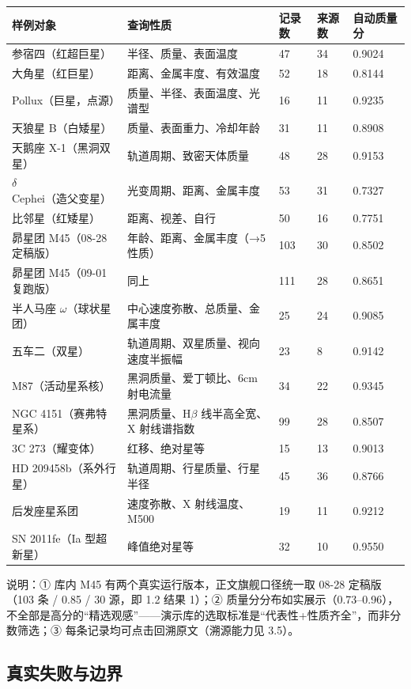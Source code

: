 \begin{longtable}{@{}p{3.2cm}p{4.8cm}p{1.7cm}p{1.7cm}p{2.0cm}@{}}
\toprule
样例对象 & 查询性质 & 记录数 & 来源数 & 自动质量分 \\
\midrule
参宿四（红超巨星） & 半径、质量、表面温度 & 47 & 34 & 0.9024 \\
大角星（红巨星） & 距离、金属丰度、有效温度 & 52 & 18 & 0.8144 \\
Pollux（巨星，点源） & 质量、半径、表面温度、光谱型 & 16 & 11 & 0.9235 \\
天狼星 B（白矮星） & 质量、表面重力、冷却年龄 & 31 & 11 & 0.8908 \\
天鹅座 X-1（黑洞双星） & 轨道周期、致密天体质量 & 48 & 28 & 0.9153 \\
$\delta$ Cephei（造父变星） & 光变周期、距离、金属丰度 & 53 & 31 & 0.7327 \\
比邻星（红矮星） & 距离、视差、自行 & 50 & 16 & 0.7751 \\
昴星团 M45（08-28 定稿版） & 年龄、距离、金属丰度（→5 性质） & 103 & 30 & 0.8502 \\
昴星团 M45（09-01 复跑版） & 同上 & 111 & 28 & 0.8651 \\
半人马座 $\omega$（球状星团） & 中心速度弥散、总质量、金属丰度 & 25 & 24 & 0.9085 \\
五车二（双星） & 轨道周期、双星质量、视向速度半振幅 & 23 & 8 & 0.9142 \\
M87（活动星系核） & 黑洞质量、爱丁顿比、6cm 射电流量 & 34 & 22 & 0.9345 \\
NGC 4151（赛弗特星系） & 黑洞质量、H$\beta$ 线半高全宽、X 射线谱指数 & 99 & 28 & 0.8507 \\
3C 273（耀变体） & 红移、绝对星等 & 15 & 13 & 0.9013 \\
HD 209458b（系外行星） & 轨道周期、行星质量、行星半径 & 45 & 36 & 0.8766 \\
后发座星系团 & 速度弥散、X 射线温度、M500 & 19 & 11 & 0.9212 \\
SN 2011fe（Ia 型超新星） & 峰值绝对星等 & 32 & 10 & 0.9550 \\
\bottomrule
\end{longtable}

\noindent 说明：① 库内 M45 有两个真实运行版本，正文旗舰口径统一取 08-28 定稿版（103 条 / 0.85 / 30 源，即 1.2 结果 1）；② 质量分分布如实展示（0.73--0.96），不全部是高分的“精选观感”——演示库的选取标准是“代表性+性质齐全”，而非分数筛选；③ 每条记录均可点击回溯原文（溯源能力见 3.5）。

\subsection{真实失败与边界}

